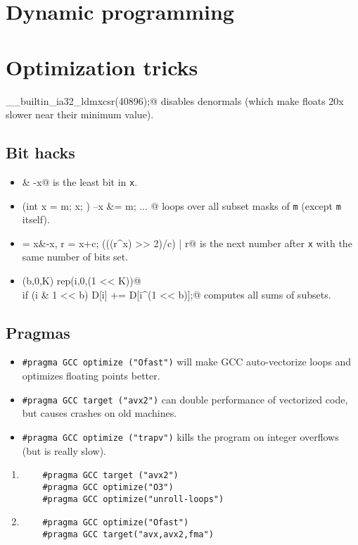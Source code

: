 \section{Dynamic programming}

\section{Optimization tricks}
	\verb@__builtin_ia32_ldmxcsr(40896);@ disables denormals (which make floats 20x slower near their minimum value).
	\subsection{Bit hacks}
		\begin{itemize}
			\item \verb@x & -x@ is the least bit in \texttt{x}.
			\item \verb@for (int x = m; x; ) { --x &= m; ... }@ loops over all subset masks of \texttt{m} (except \texttt{m} itself).
			\item \verb@c = x&-x, r = x+c; (((r^x) >> 2)/c) | r@ is the next number after \texttt{x} with the same number of bits set.
			\item \verb@rep(b,0,K) rep(i,0,(1 << K))@ \\ \verb@  if (i & 1 << b) D[i] += D[i^(1 << b)];@ computes all sums of subsets.
		\end{itemize}
	\subsection{Pragmas}
		\begin{itemize}
			\item \lstinline{#pragma GCC optimize ("Ofast")} will make GCC auto-vectorize loops and optimizes floating points better.
			\item \lstinline{#pragma GCC target ("avx2")} can double performance of vectorized code, but causes crashes on old machines.
			\item \lstinline{#pragma GCC optimize ("trapv")} kills the program on integer overflows (but is really slow).
		\end{itemize}

\begin{enumerate}
    \item
    \begin{verbatim}
    #pragma GCC target ("avx2")
    #pragma GCC optimize("O3")
    #pragma GCC optimize("unroll-loops")
    \end{verbatim}

    \item
    \begin{verbatim}
    #pragma GCC optimize("Ofast")
    #pragma GCC target("avx,avx2,fma")
    \end{verbatim}
\end{enumerate}

